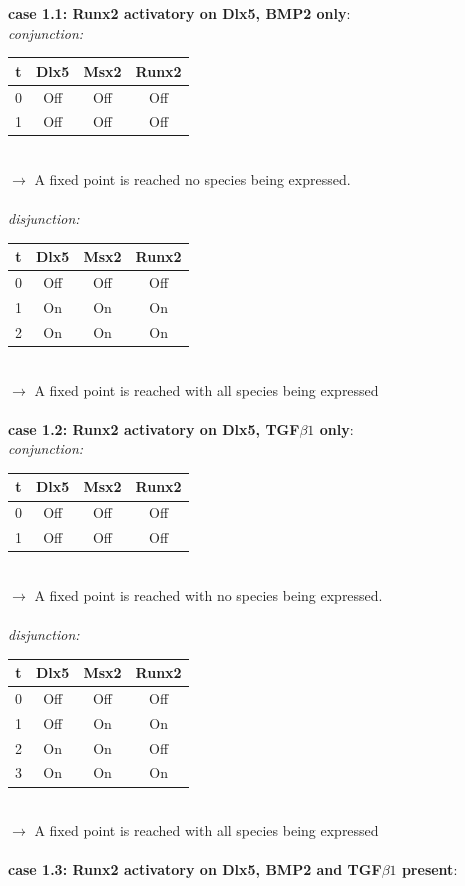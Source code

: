 \documentclass[11pt]{article}
\begin{document}
\begin{appendices}
\textbf{case 1.1: Runx2 activatory on Dlx5, BMP2 only}: \\
\textit{conjunction:}
\\
\begin{tabular}{c c c c}
t & Dlx5 & Msx2 & Runx2 \\
\hline
0 & Off & Off & Off \\
1 & Off & Off & Off
\end{tabular}
\\
$\rightarrow$ A fixed point is reached no species being expressed.  
\\ \\
\textit{disjunction:}
\\ 
\begin{tabular}{c c c c}
t & Dlx5 & Msx2 & Runx2 \\
\hline
0 & Off & Off & Off \\
1 & On & On & On \\
2 & On & On & On
\end{tabular}
\\
$\rightarrow$ A fixed point is reached with all species being expressed
\\ \\
\textbf{case 1.2: Runx2 activatory on Dlx5, TGF$\beta1$ only}: \\
\textit{conjunction:}
\\ 
\begin{tabular}{c c c c}
t & Dlx5 & Msx2 & Runx2 \\
\hline
0 & Off & Off & Off \\
1 & Off & Off & Off
\end{tabular}
\\
$\rightarrow$ A fixed point is reached with no species being expressed.  
\\ \\
\textit{disjunction:}
\\ 
\begin{tabular}{c c c c}
t & Dlx5 & Msx2 & Runx2 \\
\hline
0 & Off & Off & Off \\
1 & Off & On & On \\
2 & On & On & Off \\
3 & On & On & On
\end{tabular}
\\
$\rightarrow$ A fixed point is reached with all species being expressed
\\ \\
\textbf{case 1.3: Runx2 activatory on Dlx5, BMP2 and TGF$\beta1$ present}: \\

\end{appendices}
\end{document}
